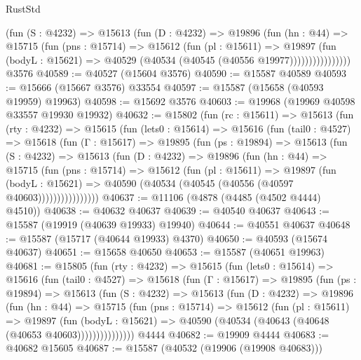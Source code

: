 \begin{lexlean}{RustStd}
\begin{coremodule}
                  (fun (S : @4232) =>
                  @15613
                    (fun (D : @4232) =>
                    @19896
                      (fun (hn : @44) =>
                      @15715
                        (fun (pns : @15714) =>
                        @15612
                          (fun (pl : @15611) =>
                          @19897
                            (fun (bodyL : @15621) =>
                            @40529 (@40534 (@40545 (@40556 @19977))))))))))))))))
    @3576
@40589 := @40527 (@15604 @3576)
@40590 := @15587 @40589
@40593 := @15666 (@15667 @3576) @33554
@40597 := @15587 (@15658 (@40593 @19959) @19963)
@40598 := @15692 @3576
@40603 := @19968 (@19969 @40598 @33557 @19930 @19932)
@40632 := @15802
    (fun (rc : @15611) =>
    @15613
      (fun (rty : @4232) =>
      @15615
        (fun (lets0 : @15614) =>
        @15616
          (fun (tail0 : @4527) =>
          @15618
            (fun (Γ : @15617) =>
            @19895
              (fun (ps : @19894) =>
              @15613
                (fun (S : @4232) =>
                @15613
                  (fun (D : @4232) =>
                  @19896
                    (fun (hn : @44) =>
                    @15715
                      (fun (pns : @15714) =>
                      @15612
                        (fun (pl : @15611) =>
                        @19897
                          (fun (bodyL : @15621) =>
                          @40590 (@40534 (@40545 (@40556 (@40597 @40603))))))))))))))))
@40637 := @11106 (@4878 (@4485 (@4502 @4444) @4510))
@40638 := @40632 @40637
@40639 := @40540 @40637
@40643 := @15587 (@19919 (@40639 @19933) @19940)
@40644 := @40551 @40637
@40648 := @15587 (@15717 (@40644 @19933) @4370)
@40650 := @40593 (@15674 @40637)
@40651 := @15658 @40650
@40653 := @15587 (@40651 @19963)
@40681 := @15805
    (fun (rty : @4232) =>
    @15615
      (fun (lets0 : @15614) =>
      @15616
        (fun (tail0 : @4527) =>
        @15618
          (fun (Γ : @15617) =>
          @19895
            (fun (ps : @19894) =>
            @15613
              (fun (S : @4232) =>
              @15613
                (fun (D : @4232) =>
                @19896
                  (fun (hn : @44) =>
                  @15715
                    (fun (pns : @15714) =>
                    @15612
                      (fun (pl : @15611) =>
                      @19897
                        (fun (bodyL : @15621) =>
                        @40590 (@40534 (@40643 (@40648 (@40653 @40603)))))))))))))))
    @4444
@40682 := @19909 @4444
@40683 := @40682 @15605
@40687 := @15587 (@40532 (@19906 (@19908 @40683)))

\end{coremodule}
\end{lexlean}
